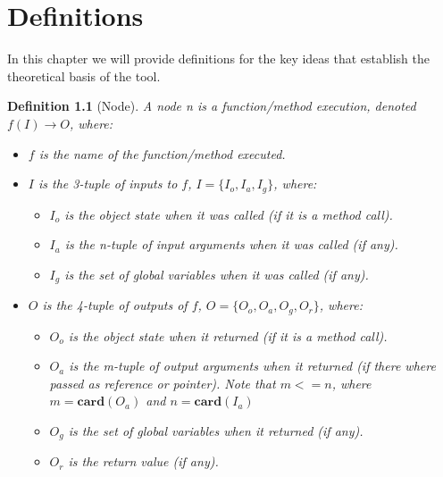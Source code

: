 \chapter{Definitions}
\label{cap:definiciones}

\newtheorem{definition}{Definition}
\newtheorem{exmp}{Example}

In this chapter we will provide definitions for the key ideas that establish the theoretical basis of the tool.

\begin{definition}[Node]
A node n is a function/method execution, denoted \(f(I) \to O\), where:
\begin{itemize}
\item \(f\) is the name of the function/method executed.
\item \(I\) is the 3-tuple of inputs to \(f\), \(I = \{I_o, I_a, I_g\}\), where:
\begin{itemize}
\item \(I_o\) is the object state when it was called (if it is a method call).
\item \(I_a\) is the n-tuple of input arguments when it was called (if any).
\item \(I_g\) is the set of global variables when it was called (if any).
\end{itemize}
\item \(O\) is the 4-tuple of outputs of \(f\), \(O = \{O_o, O_a, O_g, O_r\}\), where:
\begin{itemize}
\item \(O_o\) is the object state when it returned (if it is a method call).
\item \(O_a\) is the m-tuple of output arguments when it returned (if there where passed as reference or pointer). Note that \(m <= n\), where $m=\mathbf{card}(O_a)$ and $n=\mathbf{card}(I_a)$
\item \(O_g\) is the set of global variables when it returned (if any).
\item \(O_r\) is the return value (if any).
\end{itemize}
\end{itemize}


\end{definition}
